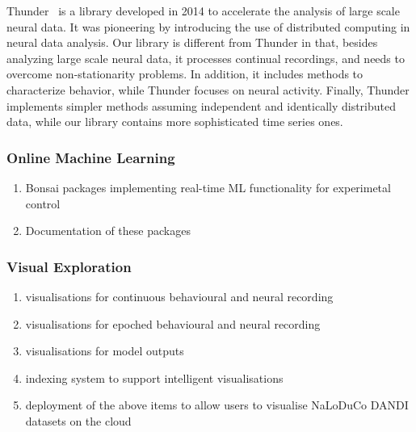Thunder~\cite{} is a library developed in 2014 to accelerate the analysis of
large scale neural data. It was pioneering by introducing the use of
distributed computing in neural data analysis.
%
Our library is different from Thunder in that, besides analyzing large scale
neural data, it processes continual recordings, and needs to overcome
non-stationarity problems.
%
In addition, it includes methods to characterize behavior, while
Thunder focuses on neural activity.
%
Finally, Thunder implements simpler methods assuming independent and
identically distributed data, while our library contains more sophisticated
time series ones.

\subsubsection{Online Machine Learning}
\label{sec:onlineAnalysisMethods}


\begin{enumerate}

    \item Bonsai packages implementing real-time ML functionality for experimetal control

    \item Documentation of these packages

\end{enumerate}

\subsubsection{Visual Exploration}
\label{sec:visualExploration}


\begin{enumerate}

    \item visualisations for continuous behavioural and neural recording

    \item visualisations for epoched behavioural and neural recording

    \item visualisations for model outputs

    \item indexing system to support intelligent visualisations

    \item deployment of the above items to allow users to visualise NaLoDuCo
        DANDI datasets on the cloud

\end{enumerate}

